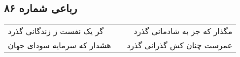 \begin{center}
\section*{رباعی شماره ۸۶}
\label{sec:sh086}
\begin{longtable}{l p{0.5cm} r}
گر یک نفست ز زندگانی گذرد
&&
مگذار که جز به شادمانی گذرد
\\
هشدار که سرمایه سودای جهان
&&
عمرست چنان کش گذرانی گذرد
\\
\end{longtable}
\end{center}
